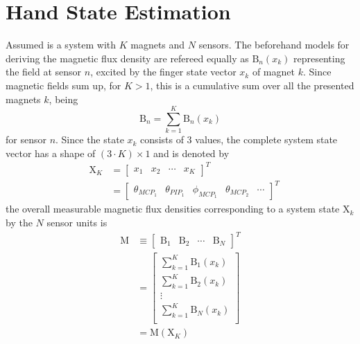 \section{Hand State Estimation} \label{sec:estimation}

Assumed is a system with $ K $ magnets and $ N $ sensors. The beforehand models for deriving the magnetic flux density are refereed equally as $ \mathrm{B}_{n}(x_{k}) $ representing the field at sensor $ n $, excited by the finger state vector $ x_{k} $ of magnet $ k $. Since magnetic fields sum up, for $ K > 1 $, this is a cumulative sum over all the presented magnets $ k $, being
\begin{equation}
\mathrm{B}_{n} = \sum_{k=1}^{K} \mathrm{B}_n(x_{k})
\end{equation}
for sensor $ n $. Since the state $ x_{k} $ consists of 3 values, the complete system state vector has a shape of $ (3 \cdot K) \times 1 $ and is denoted by
\begin{equation}
\begin{aligned}
& \mathrm{X}_K &= \begin{bmatrix} x_{1} & x_{2} & \cdots & x_{K}  \end{bmatrix}^{T}\\
&  &= \begin{bmatrix} \theta_{MCP_{1}} & \theta_{PIP_{1}} & \phi_{MCP_{1}} & \theta_{MCP_{2}} & \cdots \end{bmatrix}^{T}
\end{aligned}
\end{equation}
the overall measurable magnetic flux densities corresponding to a system state $ \mathrm{X}_{k} $ by the $ N $ sensor units is 
\begin{equation}
\begin{aligned}
\mathrm{M} &\equiv \begin{bmatrix} {\mathrm{B}}_{1} & {\mathrm{B}}_{2} & \cdots & {\mathrm{B}}_{N} \end{bmatrix}^{T}\\
		&= \begin{bmatrix}
			\sum_{k=1}^{K} \mathrm{B}_1(x_{k})\\
			\sum_{k=1}^{K} \mathrm{B}_2(x_{k})\\
			\vdots \\
		    \sum_{k=1}^{K} \mathrm{B}_N(x_{k})\\
		\end{bmatrix} \\
	    &= \mathrm{M}(\mathrm{X}_K)
\end{aligned}
\end{equation}
